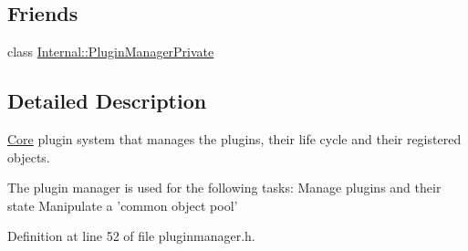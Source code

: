 \subsection*{Friends}
\begin{DoxyCompactItemize}
\item 
class \hyperlink{class_extension_system_1_1_plugin_manager_ac886620628a69def5b6d57fa12c39179}{Internal\-::\-Plugin\-Manager\-Private}
\end{DoxyCompactItemize}


\subsection{Detailed Description}
\hyperlink{namespace_core}{Core} plugin system that manages the plugins, their life cycle and their registered objects. 

The plugin manager is used for the following tasks\-:   Manage plugins and their state  Manipulate a 'common object pool' 

Definition at line 52 of file pluginmanager.\-h.



